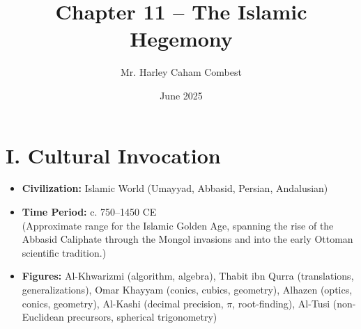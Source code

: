 \documentclass[9pt]{article}
\title{Chapter 11 -- The Islamic Hegemony}
\author{Mr. Harley Caham Combest}
\date{June 2025}
\begin{document}
\maketitle

\section*{I. Cultural Invocation}

\begin{itemize}
    \item \textbf{Civilization:} Islamic World (Umayyad, Abbasid, Persian, Andalusian)
    \item \textbf{Time Period:} c. 750--1450 CE \\
    \hspace{1em} (Approximate range for the Islamic Golden Age, spanning the rise of the Abbasid Caliphate through the Mongol invasions and into the early Ottoman scientific tradition.)

    \item \textbf{Figures:} 
    Al-Khwarizmi (algorithm, algebra), 
    Thabit ibn Qurra (translations, generalizations), 
    Omar Khayyam (conics, cubics, geometry), 
    Alhazen (optics, conics, geometry), 
    Al-Kashi (decimal precision, $\pi$, root-finding), 
    Al-Tusi (non-Euclidean precursors, spherical trigonometry)
\end{itemize}
\end{document}
